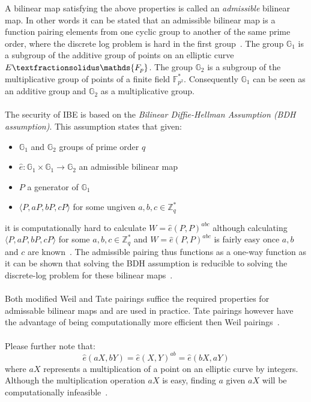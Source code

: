 \documentclass[journal]{IEEEtran}
\begin{document}
A bilinear map satisfying the above properties is called an \textit{admissible}
bilinear map. In other words it can be stated that an admissible bilinear map
is a function pairing elements from one cyclic group to another of the same
prime order, where the discrete log problem is hard in the first
group~\cite{YoungbloodIntroduction}. The group $\mathds{G}_1$ is a subgroup of
the additive group of points on an elliptic curve $E\textfractionsolidus
\mathds{F_{p}}$. The group $\mathds{G}_2$ is a subgroup of the multiplicative
group of points of a finite field $\mathds{F}_{p^{2}}^{*}$. Consequently
$\mathds{G}_1$ can be seen as an additive group and $\mathds{G}_2$ as a
multiplicative group.~\cite{BonehFranklinIBE}\\
\\
The security of IBE is based on the \textit{Bilinear Diffie-Hellman
Assumption (BDH assumption)}. This assumption states that given:
\begin{itemize}
 \item $\mathds{G}_1$ and $\mathds{G}_2$ groups of prime order $q$
 \item $\hat{e}: \mathds{G}_1 \times \mathds{G}_1 \rightarrow \mathds{G}_2$ an
admissible bilinear map
 \item $P$ a generator of $\mathds{G}_1$
 \item $\langle P, aP, bP, cP \rangle$ for some ungiven $a, b, c \in
\mathds{Z}_{q}^{*}$
\end{itemize}
it is computationally hard to calculate $W = \hat{e} \left( P , P \right)^{abc}$
although calculating $\langle P, aP, bP, cP \rangle$ for some $a, b, c \in
\mathds{Z}_{q}^{*}$ and  $W = \hat{e} \left( P , P \right)^{abc}$ is fairly
easy once $a, b$ and $c$ are known~\cite{BonehFranklinIBE}. The admissible
pairing thus functions as a one-way function as it can be shown that solving the
BDH assumption is reducible to solving the discrete-log problem for these
bilinear maps~\cite{YoungbloodIntroduction}.\\
\\
Both modified Weil and Tate pairings suffice the required properties for
admissable bilinear maps and are used in practice. Tate pairings however have
the advantage of being computationally more efficient then Weil
pairings~\cite{YacovBilinear}.\\
\\
Please further note that:
\begin{equation} \label{eq:sym}
 \hat{e} \left( aX, bY\right) = \hat{e} \left( X, Y\right)^{ab} = \hat{e} \left(
bX, aY\right)
\end{equation}
where $aX$ represents a multiplication of a point on an elliptic curve by
integers. Although the multiplication operation $aX$ is easy, finding $a$ given
$aX$ will be computationally infeasible~\cite{YoungbloodIntroduction}.
\end{document}
